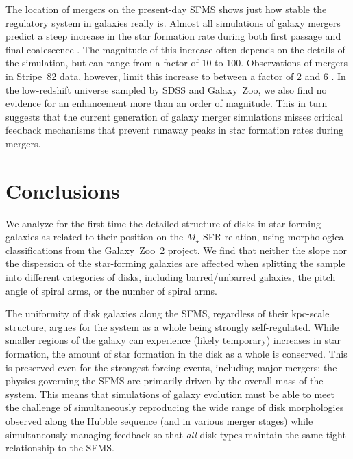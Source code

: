 \documentclass{emulateapj}
\begin{document}
The location of mergers on the present-day SFMS shows just how stable the regulatory system in galaxies really is. Almost all simulations of galaxy mergers predict a steep increase in the star formation rate during both first passage and final coalescence \citep[eg,][]{hop08}. The magnitude of this increase often depends on the details of the simulation, but can range from a factor of 10 to 100. Observations of mergers in Stripe~82 data, however, limit this increase to between a factor of 2 and 6 \citep{kav14}. In the low-redshift universe sampled by SDSS and Galaxy~Zoo, we also find no evidence for an enhancement more than an order of magnitude. This in turn suggests that the current generation of galaxy merger simulations misses critical feedback mechanisms that prevent runaway peaks in star formation rates during mergers.

\section{Conclusions}

We analyze for the first time the detailed structure of disks in star-forming galaxies as related to their position on the $M_\star$-SFR relation, using morphological classifications from the Galaxy~Zoo~2 project. We find that neither the slope nor the dispersion of the star-forming galaxies are affected when splitting the sample into different categories of disks, including barred/unbarred galaxies, the pitch angle of spiral arms, or the number of spiral arms. 

The uniformity of disk galaxies along the SFMS, regardless of their kpc-scale structure, argues for the system as a whole being strongly self-regulated. While smaller regions of the galaxy can experience (likely temporary) increases in star formation, the amount of star formation in the disk as a whole is conserved. This is preserved even for the strongest forcing events, including major mergers; the physics governing the SFMS are primarily driven by the overall mass of the system. This means that simulations of galaxy evolution must be able to meet the challenge of simultaneously reproducing the wide range of disk morphologies observed along the Hubble sequence (and in various merger stages) while simultaneously managing feedback so that \emph{all} disk types maintain the same tight relationship to the SFMS.


\acknowledgments
\end{document}

